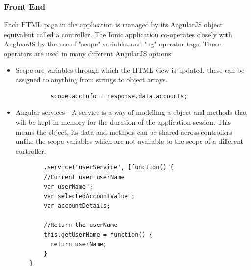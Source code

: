 \subsubsection{Front End}
    Each HTML page in the application is managed by its AngularJS object equivalent called a controller.
    The Ionic application co-operates closely with AngluarJS by the use of "scope" variables and "ng" operator tags. 
    These operators are used in many different AngularJS options:
    \begin{itemize}
        \item Scope are variables through which the HTML view is updated. these can be assigned to anything from strings to object arrays.
\begin{verbatim}
          scope.accInfo = response.data.accounts;
\end{verbatim}

        \item Angular services - A service is a way of modelling a object and methods that will be kept in memory for the duration of the application session. This means the object, its data and methods can be shared across controllers unlike the scope variables which are not available to the scope of a different controller.
        
\begin{verbatim}
        .service('userService', [function() {
        //Current user userName
        var userName";
        var selectedAccountValue ;
        var accountDetails;
    
        //Return the userName
        this.getUserName = function() {
          return userName;
        }
    }
\end{verbatim}


\end{itemize}
